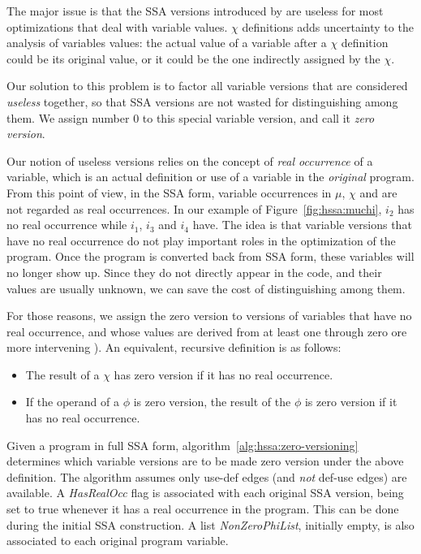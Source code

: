 The major issue is that the SSA versions introduced by \chiops are useless for most optimizations that deal with variable values. $\chi$ definitions adds uncertainty to the analysis of variables values: the actual value of a variable after a $\chi$ definition could be its original value, or it could be the one indirectly assigned by the $\chi$.

Our solution to this problem is to factor all variable versions that are considered \emph{useless} together, so that SSA versions are not wasted for distinguishing among them. We assign number 0 to this special variable version, and call it {\em zero version}.

Our notion of useless versions relies on the concept of {\em real occurrence} of a variable, which is an actual definition or use of a variable in the \emph{original} program. 
From this point of view, in the SSA form, variable occurrences in $\mu$, $\chi$ and \phifuns are not regarded as real occurrences. In our example of Figure~\ref{fig:hssa:muchi}, $i_2$ has no real occurrence while $i_1$, $i_3$ and $i_4$ have. The idea is that variable versions that have no real occurrence do not
play important roles in the optimization of the program.
Once the program is converted back from SSA form, these variables will no longer
show up.
Since they do not directly appear in the code, and their values are usually unknown, we can save the cost of distinguishing among them.

For those reasons, we assign the zero version to versions of variables that have no real occurrence, and whose values are derived from at least one \chifun through zero ore more intervening \phifuns). An equivalent, recursive definition is as follows:
\begin{itemize}
\item The result of a $\chi$ has zero version if it has no real occurrence.
\item If the operand of a $\phi$ is zero version, the result of the $\phi$ is zero version if it has no real occurrence.
\end{itemize}

Given a program in full SSA form,
algorithm~\ref{alg:hssa:zero-versioning} determines which
variable versions are to be made zero version under the above definition.
The algorithm assumes only use-def edges (and {\em not} def-use edges) are available.
A \emph{HasRealOcc} flag is associated with each original SSA version, being
set to true whenever it has a real occurrence in the program. 
This can be done during the initial SSA construction. 
A list \emph{NonZeroPhiList}, initially empty, is also associated to each original program variable.

